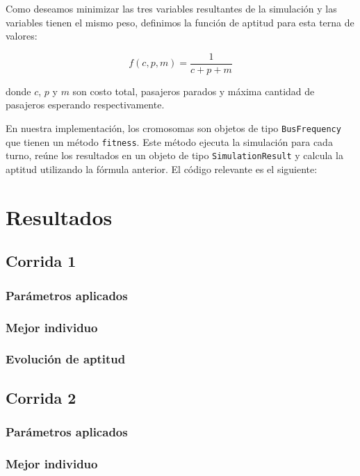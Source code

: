 \documentclass[a4paper,12pt]{article}
\begin{document}
Como deseamos minimizar las tres variables resultantes de la simulación y las variables tienen el mismo peso, definimos la función de aptitud para esta terna de valores:

\[ f(c, p, m) = \frac{1}{c + p + m} \]

donde $c$, $p$ y $m$ son costo total, pasajeros parados y máxima cantidad de pasajeros esperando respectivamente.

En nuestra implementación, los cromosomas son objetos de tipo \texttt{BusFrequency} que tienen un método \texttt{fitness}.
Este método ejecuta la simulación para cada turno, reúne los resultados en un objeto de tipo \texttt{SimulationResult} y calcula la aptitud utilizando la fórmula anterior.
El código relevante es el siguiente:



\section{Resultados}

\subsection{Corrida 1}

\subsubsection*{Parámetros aplicados}

\subsubsection*{Mejor individuo}

\subsubsection*{Evolución de aptitud}

\subsection{Corrida 2}

\subsubsection*{Parámetros aplicados}

\subsubsection*{Mejor individuo}
\end{document}
